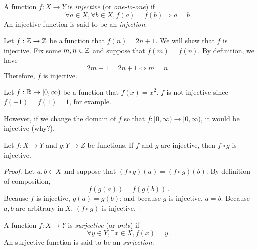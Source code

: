 \begin{definition}[Injection]
    A function $f:X \to Y$ is \emph{injective} (or \emph{one-to-one}) if 
    \begin{equation*}
        \forall a \in X, \forall b \in X, f(a) = f(b) \Rightarrow a = b\,.
    \end{equation*}
    An injective function is said to be an \emph{injection}.
\end{definition}

\begin{example}
    Let $f:\mathbb{Z} \to \mathbb{Z}$ be a function that $f(n) = 2n +1$.
    We will show that $f$ is injective. 
    Fix some $m,n \in \mathbb{Z}$ and suppose that $f(m) = f(n)$.
    By definition, we have
    \begin{equation*}
        2m + 1= 2n + 1 \iff m = n \,.
    \end{equation*}
    Therefore,  $f$ is injective.
\end{example}


\begin{example}
    Let $f:\mathbb{R} \to [0,\infty)$ be a function that $f(x) = x^2$.
    $f$ is not injective since $f(-1)= f(1) = 1$, for example.

    However, if we change the domain of $f$ so that
    $f:[0,\infty) \to [0,\infty)$, it would be injective (why?).
\end{example}

\begin{proposition}
    Let $f: X \to Y$ and $g:Y\to Z$ be functions. 
    If $f$ and $g$ are injective, then $f\circ g$ is injective.
\end{proposition}

\begin{proof}
    Let $a,b\in X$ and suppose that $(f\circ g)(a) = (f\circ g)(b)$. 
    By definition of composition,
    \begin{equation*}
        f(g(a)) = f(g(b))\,.
    \end{equation*}
    Because $f$ is injective, $g(a) = g(b)$; and because $g$ is injective, $a=b$.
    Because $a,b$ are arbitrary in $X$, $(f\circ g)$ is injective.
\end{proof}

\begin{definition}[Surjection]
    A function $f:X \to Y$ is \emph{surjective} (or \emph{onto}) if 
    \begin{equation*}
        \forall y \in Y, \exists x \in X, f(x) = y \,.
    \end{equation*}
    An surjective function is said to be an \emph{surjection}.
\end{definition}

